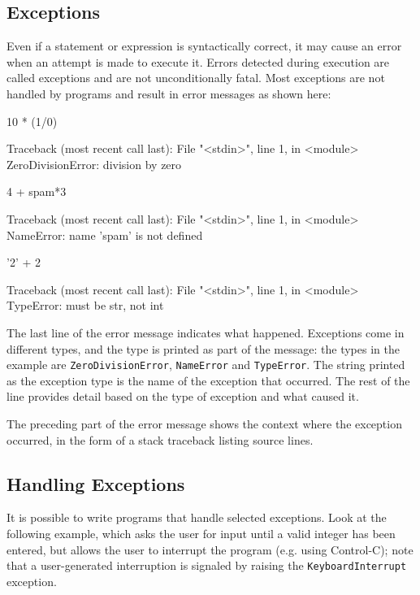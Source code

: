 \subsection{Exceptions}
Even if a statement or expression is syntactically correct, it may cause 
an error when an attempt is made to execute it. 
Errors detected during execution are called exceptions and are not unconditionally fatal.
Most exceptions are not handled by programs and result in error 
messages as shown here:

\begin{ipython}
10 * (1/0)
\end{ipython}
\begin{ioutput}
Traceback (most recent call last):
  File "<stdin>", line 1, in <module>
ZeroDivisionError: division by zero
\end{ioutput}

\begin{ipython}
4 + spam*3
\end{ipython}
\begin{ioutput}
Traceback (most recent call last):
  File "<stdin>", line 1, in <module>
NameError: name 'spam' is not defined
\end{ioutput}

\begin{ipython}
'2' + 2
\end{ipython}
\begin{ioutput}
Traceback (most recent call last):
  File "<stdin>", line 1, in <module>
TypeError: must be str, not int
\end{ioutput}

The last line of the error message indicates what happened. Exceptions come in different types, and the type is printed as part of the message: the types in the example are \texttt{ZeroDivisionError}, \texttt{NameError} and \texttt{TypeError}. The string printed as the exception type is the name of the exception that occurred. The rest of the line provides detail based on the type of exception and what caused it.

The preceding part of the error message shows the context where the exception occurred, in the form of a stack traceback listing source lines.

\subsection{Handling Exceptions}
It is possible to write programs that handle selected exceptions. Look at the following example, which asks the user for input until a valid integer has been entered, but allows the user to interrupt the program (e.g. using Control-C); note that a user-generated interruption is signaled by raising the \texttt{KeyboardInterrupt} exception.

